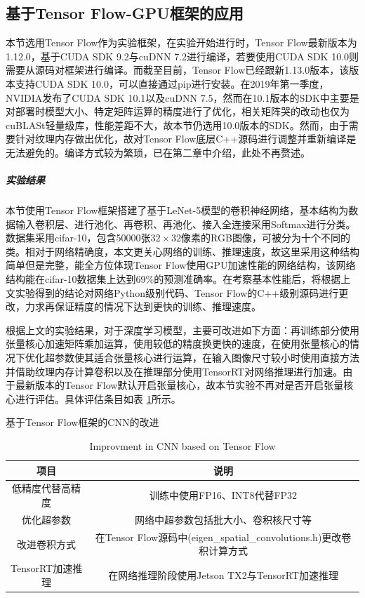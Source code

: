 \subsection{基于Tensor Flow-GPU框架的应用}
\par 本节选用Tensor Flow作为实验框架，在实验开始进行时，Tensor Flow最新版本为1.12.0，基于CUDA SDK 9.2与cuDNN 7.2进行编译，若要使用CUDA SDK 10.0则需要从源码对框架进行编译。而截至目前，Tensor Flow已经跟新1.13.0版本，该版本支持CUDA SDK 10.0，可以直接通过pip进行安装。在2019年第一季度，NVIDIA发布了CUDA SDK 10.1以及cuDNN 7.5，然而在10.1版本的SDK中主要是对部署时模型大小、特定矩阵运算的精度进行了优化，相关矩阵哭的改动也仅为cuBLASt轻量级库，性能差距不大，故本节仍选用10.0版本的SDK。然而，由于需要针对纹理内存做出优化，故对Tensor Flow底层C++源码进行调整并重新编译是无法避免的。编译方式较为繁琐，已在第二章中介绍，此处不再赘述。
\subparagraph{实验结果}
\par 本节使用Tensor Flow框架搭建了基于LeNet-5模型的卷积神经网络，基本结构为数据输入卷积层、进行池化、再卷积、再池化、接入全连接采用Softmax进行分类。数据集采用cifar-10，包含50000张$ 32 \times 32 $像素的RGB图像，可被分为十个不同的类。相对于网络精确度，本文更关心网络的训练、推理速度，故这里采用这种结构简单但是完整，能全方位体现Tensor Flow使用GPU加速性能的网络结构，该网络结构能在cifar-10数据集上达到69\%的预测准确率。在考察基本性能后，将根据上文实验得到的结论对网络Python级别代码、Tensor Flow的C++级别源码进行更改，力求再保证精度的情况下达到更快的训练、推理速度。
\par 根据上文的实验结果，对于深度学习模型，主要可改进如下方面：再训练部分使用张量核心加速矩阵乘加运算，使用较低的精度换更快的速度，在使用张量核心的情况下优化超参数使其适合张量核心进行运算，在输入图像尺寸较小时使用直接方法并借助纹理内存计算卷积以及在推理部分使用TensorRT对网络推理进行加速。由于最新版本的Tensor Flow默认开启张量核心，故本节实验不再对是否开启张量核心进行评估。具体评估条目如表 \ref{table-TFList}所示。
\begin{table}
	\centering
	\renewcommand{\thetable}{\arabic{section}-\arabic{table} }
	\renewcommand{\tablename}{表}
	\caption{基于Tensor Flow框架的CNN的改进}
	\addtocounter{table}{-1}
	\renewcommand{\thetable}{\arabic{section}-\arabic{table} }
	\renewcommand{\tablename}{Table}
	\caption{Improvment in CNN based on Tensor Flow}
	\begin{tabular}{cc}
		\toprule
		项目 & 说明\\
		\midrule
		低精度代替高精度 & 训练中使用FP16、INT8代替FP32\\
		优化超参数 & 网络中超参数包括批大小、卷积核尺寸等\\
		改进卷积方式 & 在Tensor Flow源码中(eigen\_spatial\_convolutions.h)更改卷积计算方式\\
		TensorRT加速推理 & 在网络推理阶段使用Jetson TX2与TensorRT加速推理\\
		\bottomrule
	\end{tabular} \label{table-TFList} 
\end{table}
